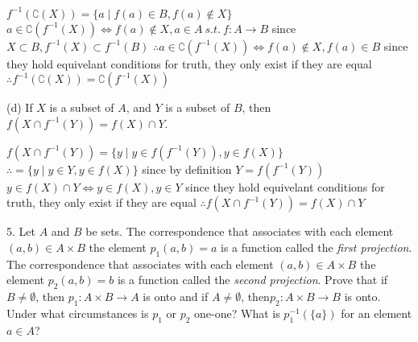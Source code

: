 $f^{-1}(\complement(X)) = \{ a \mid f(a) \in B, f(a) \not \in X\}$
$a \in \complement(f^{-1}(X)) \iff f(a) \not \in X, a \in A\ s.t.\ f:A \rightarrow B$ since $X \subset B, f^{-1}(X) \subset f^{-1}(B)$
$\therefore a \in \complement(f^{-1}(X)) \iff f(a) \not \in X, f(a) \in B$
since they hold equivelant conditions for truth, they only exist if they are equal
$\therefore f^{-1}(\complement(X)) = \complement(f^{-1}(X))$

(d) If $X$ is a subset of $A$, and $Y$ is a subset of $B$, then $f(X \cap f^{-1}(Y)) = f(X) \cap Y$.

$f(X \cap f^{-1}(Y)) = \{ y \mid y \in f(f^{-1}(Y)), y \in f(X)\}$
$\therefore = \{y \mid y \in Y, y \in f(X)\}$ since by definition $Y =  f(f^{-1}(Y))$
$y \in f(X)\cap Y \iff y \in f(X), y \in Y$
since they hold equivelant conditions for truth, they only exist if they are equal
$\therefore f(X \cap f^{-1}(Y)) = f(X) \cap Y$

5. Let $A$ and $B$ be sets. The correspondence that associates with each element $(a, b) \in A \times B$ the element $p_{1}(a, b) = a$ is a function called the \textit{first projection}. The correspondence that associates with each element $(a, b) \in A \times B$ the element $p_{2}(a, b) = b$ is a function called the \textit{second projection}. Prove that if $B \not = \emptyset$, then $p_{1}:A \times B \rightarrow A$ is onto and if $A \not = \emptyset$, then$p_{2}:A \times B  \rightarrow B$ is onto. Under what circumstances is $p_{1}$ or $p_{2}$ one-one? What is $p_{1}^{-1}(\{a\})$ for an element $a \in A$?


